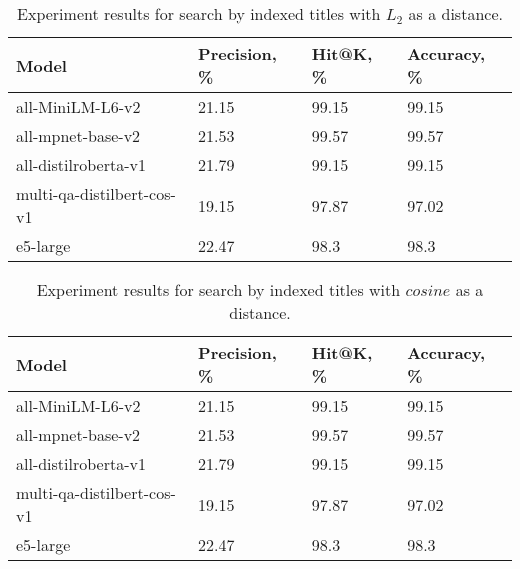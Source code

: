 \begin{table*}[!htbp]
    \small
    \centering
    \caption{Experiment results for search by indexed titles with \(L_{2}\) as a distance.}

    \begin{tabularx}{0.99\textwidth}{XIII}

        \toprule

        \bfseries Model & \bfseries Precision, \% & \bfseries Hit@K, \% & \bfseries Accuracy, \% \\

        \midrule
        
        all-MiniLM-L6-v2	& 21.15 &	99.15 &	99.15 \\
        all-mpnet-base-v2	& 21.53 &	99.57 &	99.57 \\
        all-distilroberta-v1	& 21.79 &	99.15 &	99.15 \\
        multi-qa-distilbert-cos-v1	& 19.15 &	97.87 &	97.02 \\
        e5-large	& 22.47 &	98.3  &	98.3 \\

        \bottomrule

    \end{tabularx}

    \label{tab:experiments:title-l2}
\end{table*}

\begin{table*}[!htbp]
    \small
    \centering
    \caption{Experiment results for search by indexed titles with \(cosine\) as a distance.}

    \begin{tabularx}{0.99\textwidth}{XIII}

        \toprule

        \bfseries Model & \bfseries Precision, \% & \bfseries Hit@K, \% & \bfseries Accuracy, \% \\

        \midrule
        
        all-MiniLM-L6-v2	& 21.15 &	99.15 &	99.15 \\
        all-mpnet-base-v2	& 21.53 &	99.57 &	99.57 \\
        all-distilroberta-v1	& 21.79 &	99.15 &	99.15 \\
        multi-qa-distilbert-cos-v1	& 19.15 &	97.87 &	97.02 \\
        e5-large	& 22.47 &	98.3  &	98.3 \\

        \bottomrule

    \end{tabularx}

    \label{tab:experiments:title-cos}
\end{table*}
